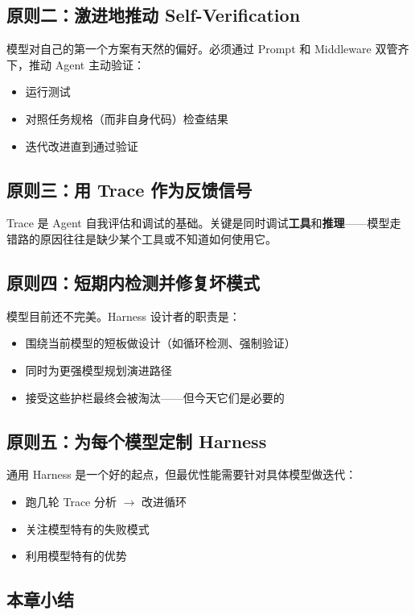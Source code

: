 \documentclass[a4paper]{article}
\begin{document}
\subsection{原则二：激进地推动 Self-Verification}

模型对自己的第一个方案有天然的偏好。必须通过 Prompt 和 Middleware 双管齐下，推动 Agent 主动验证：
\begin{itemize}[leftmargin=1.5em]
    \item 运行测试
    \item 对照任务规格（而非自身代码）检查结果
    \item 迭代改进直到通过验证
\end{itemize}

\subsection{原则三：用 Trace 作为反馈信号}

Trace 是 Agent 自我评估和调试的基础。关键是同时调试\textbf{工具}和\textbf{推理}——模型走错路的原因往往是缺少某个工具或不知道如何使用它。

\subsection{原则四：短期内检测并修复坏模式}

模型目前还不完美。Harness 设计者的职责是：
\begin{itemize}[leftmargin=1.5em]
    \item 围绕当前模型的短板做设计（如循环检测、强制验证）
    \item 同时为更强模型规划演进路径
    \item 接受这些护栏最终会被淘汰——但今天它们是必要的
\end{itemize}

\subsection{原则五：为每个模型定制 Harness}

通用 Harness 是一个好的起点，但最优性能需要针对具体模型做迭代：
\begin{itemize}[leftmargin=1.5em]
    \item 跑几轮 Trace 分析 $\rightarrow$ 改进循环
    \item 关注模型特有的失败模式
    \item 利用模型特有的优势
\end{itemize}

\subsection{本章小结}
\end{document}
